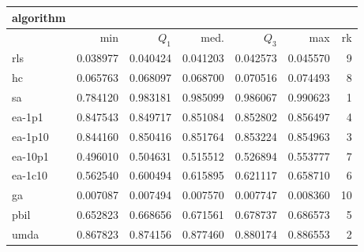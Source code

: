 \begin{tabular}{@{}l*{5}{>{{}}N{1}{3}}>{{}}N{2}{0}@{}}
\toprule
{algorithm} &  \\
\midrule
& {min} & {$Q_1$} & {med.} & {$Q_3$} & {max} & {rk}\\
\midrule
rls & 0.038977 & 0.040424 & 0.041203 & 0.042573 & 0.045570 & 9\\
hc & 0.065763 & 0.068097 & 0.068700 & 0.070516 & 0.074493 & 8\\
sa & 0.784120 & {\color{blue}} 0.983181 & {\color{blue}} 0.985099 & {\color{blue}} 0.986067 & {\color{blue}} 0.990623 & 1\\
ea-1p1 & 0.847543 & 0.849717 & 0.851084 & 0.852802 & 0.856497 & 4\\
ea-1p10 & 0.844160 & 0.850416 & 0.851764 & 0.853224 & 0.854963 & 3\\
ea-10p1 & 0.496010 & 0.504631 & 0.515512 & 0.526894 & 0.553777 & 7\\
ea-1c10 & 0.562540 & 0.600494 & 0.615895 & 0.621117 & 0.658710 & 6\\
ga & 0.007087 & 0.007494 & 0.007570 & 0.007747 & 0.008360 & 10\\
pbil & 0.652823 & 0.668656 & 0.671561 & 0.678737 & 0.686573 & 5\\
umda & {\color{blue}} 0.867823 & 0.874156 & 0.877460 & 0.880174 & 0.886553 & 2\\
\bottomrule
\end{tabular}
